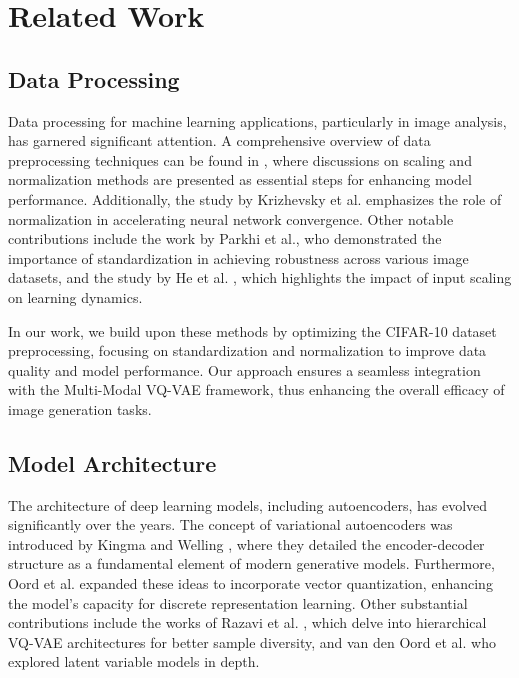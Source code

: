 \documentclass{article} %
\begin{document}
\section{Related Work}

\subsection{Data Processing}

Data processing for machine learning applications, particularly in image analysis, has garnered significant attention. A comprehensive overview of data preprocessing techniques can be found in \citep{agarwal2019data}, where discussions on scaling and normalization methods are presented as essential steps for enhancing model performance. Additionally, the study by Krizhevsky et al. \citep{krizhevsky2012imagenet} emphasizes the role of normalization in accelerating neural network convergence. Other notable contributions include the work by Parkhi et al., who demonstrated the importance of standardization in achieving robustness across various image datasets, and the study by He et al. \citep{he2016deep}, which highlights the impact of input scaling on learning dynamics.

In our work, we build upon these methods by optimizing the CIFAR-10 dataset preprocessing, focusing on standardization and normalization to improve data quality and model performance. Our approach ensures a seamless integration with the Multi-Modal VQ-VAE framework, thus enhancing the overall efficacy of image generation tasks.

\subsection{Model Architecture}

The architecture of deep learning models, including autoencoders, has evolved significantly over the years. The concept of variational autoencoders was introduced by Kingma and Welling \citep{kingma2013auto}, where they detailed the encoder-decoder structure as a fundamental element of modern generative models. Furthermore, Oord et al. expanded these ideas to incorporate vector quantization, enhancing the model’s capacity for discrete representation learning. Other substantial contributions include the works of Razavi et al. \citep{razavi2019generating}, which delve into hierarchical VQ-VAE architectures for better sample diversity, and van den Oord et al. who explored latent variable models in depth.
\end{document}
